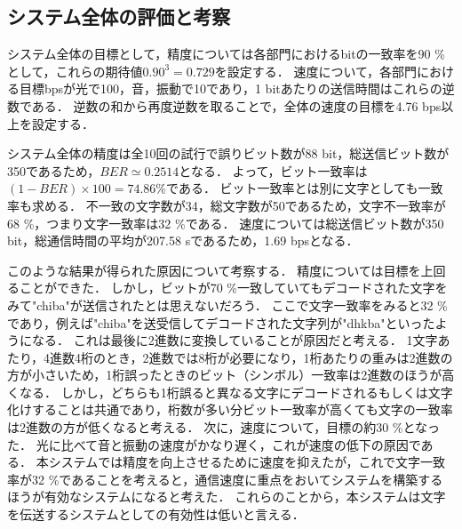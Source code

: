 \subsection{システム全体の評価と考察}
システム全体の目標として，精度については各部門におけるbitの一致率を90 \%として，これらの期待値$0.90^{3} = 0.729$を設定する．
速度について，各部門における目標bpsが光で100，音，振動で10であり，1 bitあたりの送信時間はこれらの逆数である．
逆数の和から再度逆数を取ることで，全体の速度の目標を4.76 bps以上を設定する．
\par
システム全体の精度は全10回の試行で誤りビット数が88 bit，総送信ビット数が350であるため，$BER \simeq 0.2514$となる．
よって，ビット一致率は$(1-BER)\times100 = 74.86 \%$である．
ビット一致率とは別に文字としても一致率も求める．
不一致の文字数が34，総文字数が50であるため，文字不一致率が68 \%，つまり文字一致率は32 \%である．
速度については総送信ビット数が350 bit，総通信時間の平均が207.58 sであるため，1.69 bpsとなる．

\par
このような結果が得られた原因について考察する．
精度については目標を上回ることができた．
しかし，ビットが70 \%一致していてもデコードされた文字をみて"chiba"が送信されたとは思えないだろう．
ここで文字一致率をみると32 \%であり，例えば"chiba"を送受信してデコードされた文字列が"dhkba"といったようになる．
これは最後に2進数に変換していることが原因だと考える．
1文字あたり，4進数4桁のとき，2進数では8桁が必要になり，1桁あたりの重みは2進数の方が小さいため，1桁誤ったときのビット（シンボル）一致率は2進数のほうが高くなる．
しかし，どちらも1桁誤ると異なる文字にデコードされるもしくは文字化けすることは共通であり，桁数が多い分ビット一致率が高くても文字の一致率は2進数の方が低くなると考える．
次に，速度について，目標の約30 \%となった．
光に比べて音と振動の速度がかなり遅く，これが速度の低下の原因である．
本システムでは精度を向上させるために速度を抑えたが，これで文字一致率が32 \%であることを考えると，通信速度に重点をおいてシステムを構築するほうが有効なシステムになると考えた．
これらのことから，本システムは文字を伝送するシステムとしての有効性は低いと言える．